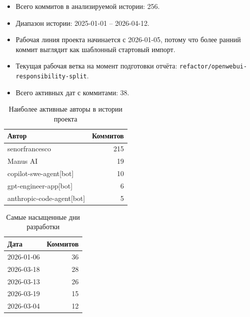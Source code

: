 \begin{itemize}
\item Всего коммитов в анализируемой истории: 256.
\item Диапазон истории: 2025-01-01 -- 2026-04-12.
\item Рабочая линия проекта начинается с 2026-01-05, потому что более ранний коммит выглядит как шаблонный стартовый импорт.
\item Текущая рабочая ветка на момент подготовки отчёта: \texttt{refactor/openwebui-responsibility-split}.
\item Всего активных дат с коммитами: 38.
\end{itemize}

\begin{table}[h]
\centering
\begin{tabular}{lr}
\textbf{Автор} & \textbf{Коммитов} \\
\hline
senorfrancesco & 215 \\
Manus AI & 19 \\
copilot-swe-agent[bot] & 10 \\
gpt-engineer-app[bot] & 6 \\
anthropic-code-agent[bot] & 5 \\
\end{tabular}
\caption{Наиболее активные авторы в истории проекта}
\end{table}

\begin{table}[h]
\centering
\begin{tabular}{lr}
\textbf{Дата} & \textbf{Коммитов} \\
\hline
2026-01-06 & 36 \\
2026-03-18 & 28 \\
2026-03-13 & 26 \\
2026-03-19 & 15 \\
2026-03-04 & 12 \\
\end{tabular}
\caption{Самые насыщенные дни разработки}
\end{table}
